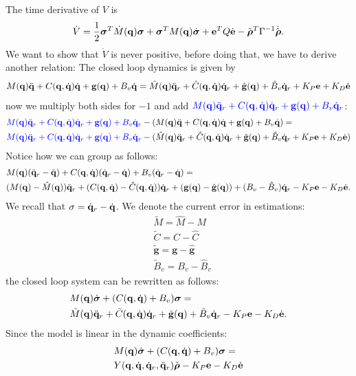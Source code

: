 \documentclass[10pt, a4paper]{report}
\newcommand{\q}{{\mathbf q}}
\begin{document}
The time derivative of $V$ is\begin{equation}
    \dot V = \frac{1}{2}\bsigma^T\dot M(\q)\bsigma+\bsigma^TM(\q)\dot\bsigma+\mathbf e^T Q \de-\tilde\brho^T\Gamma^{-1}\dot{\hat\brho}. 
\end{equation}
We want to show that $\dot V$ is never positive, before doing that, we have to derive another relation: The closed loop dynamics is given by\begin{align}
    M(\q)\ddq+C(\q,\dq)\dq+\mathbf g(\q)+B_v\dq=
    \hat M(\q)\ddq_r+\hat C(\q,\dq)\dq_r+\hat{\mathbf g}(\q)+\hat B_v\dq_r+K_P\mathbf e+K_D\de
\end{align}
now we multiply both sides for $-1$ and add $\blueText{M(\q)\ddq_r+C(\q,\dq)\dq_r+\mathbf g(\q)+B_v\dq_r}$:
\begin{align}
    &\blueText{M(\q)\ddq_r+C(\q,\dq)\dq_r+\mathbf g(\q)+B_v\dq_r}-(M(\q)\ddq+C(\q,\dq)\dq+\mathbf g(\q)+B_v\dq)=\\
    &\blueText{M(\q)\ddq_r+C(\q,\dq)\dq_r+\mathbf g(\q)+B_v\dq_r}-(\hat M(\q)\ddq_r+\hat C(\q,\dq)\dq_r+\hat{\mathbf g}(\q)+\hat B_v\dq_r+K_P\mathbf e+K_D\de)
\end{align}
Notice how we can group as follows:
\begin{align}
    &M(\q)(\ddq_r-\ddq)+C(\q,\dq)(\dq_r-\dq)+B_v(\dq_r-\dq)=\\
    &(M(\q)-\hat M(\q))\ddq_r+(C(\q,\dq)-\hat C(\q,\dq))\dq_r +
    (\mathbf g(\q)-\hat{\mathbf g}(\q))+( B_v-\hat B_v)\dq_r - K_P\mathbf e-K_D\de.
\end{align}
We recall that $\sigma = {\dot{\mathbf q}}_r-{\dot{\mathbf q}}$.  We denote the current error in estimations:\begin{align}
   & \tilde M = \hat M-M\\ 
    & \tilde C=C-\hat C\\ 
    &\tilde{\mathbf g}=\mathbf g-\hat{\mathbf g}\\ 
    &\tilde B_v=B_v-\hat B_v 
\end{align}
the closed loop system can be rewritten as follows:\begin{align}
    &M(\q)\dot{\bsigma}+(C(\q,\dq)+B_v)\bsigma=\\ 
    &\tilde M(\q)\ddq_r+\tilde C(\q,\dq)\dq_r+\tilde{\mathbf g}(\q)+\tilde B_v\dq_r- K_P\mathbf e-K_D\de.
\end{align}
Since the model is linear in the dynamic coefficients:\begin{align}
    &M(\q)\dot{\bsigma}+(C(\q,\dq)+B_v)\bsigma=\\ 
    &Y(\q,\dq,\dq_r,\ddq_r)\tilde\brho- K_P\mathbf e-K_D\de
\end{align}
\end{document}

